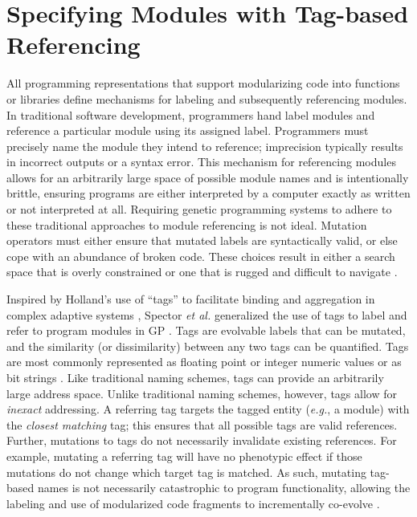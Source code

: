 
\section{Specifying Modules with Tag-based Referencing}
\label{chapter:tag-based-regulation:sec:tag-based-referencing}

All programming representations that support modularizing code into functions or libraries define mechanisms for labeling and subsequently referencing modules. 
In traditional software development, programmers hand label modules and reference a particular module using its assigned label.
Programmers must precisely name the module they intend to reference; imprecision typically results in incorrect outputs or a syntax error. 
This mechanism for referencing modules allows for an arbitrarily large space of possible module names and is intentionally brittle, ensuring programs are either interpreted by a computer exactly as written or not interpreted at all. 
Requiring genetic programming systems to adhere to these traditional approaches to module referencing is not ideal. 
Mutation operators must either ensure that mutated labels are syntactically valid, or else cope with an abundance of broken code.
These choices result in either a search space that is overly constrained or one that is rugged and difficult to navigate \citep{rasmussen_coreworld_1990}.

Inspired by Holland's use of ``tags'' to facilitate binding and aggregation in complex adaptive systems \citep{holland_concerning_1990,holland_effect_1993}, %
Spector \textit{et al.} generalized the use of tags to label and refer to program modules in GP \citep{spector_tag-based_2011,spector_whats_2011}.
Tags are evolvable labels that can be mutated, and the similarity (or dissimilarity) between any two tags can be quantified. 
Tags are most commonly represented as floating point or integer numeric values \citep{keijzer_run_2004,spector_tag-based_2011} or as bit strings \citep{lalejini_evolving_2018}.
Like traditional naming schemes, tags can provide an arbitrarily large address space.
Unlike traditional naming schemes, however, tags allow for \textit{inexact} addressing. 
A referring tag targets the tagged entity (\textit{e.g.}, a module) with the \textit{closest matching} tag; 
this ensures that all possible tags are valid references.
Further, mutations to tags do not necessarily invalidate existing references.
For example, mutating a referring tag will have no phenotypic effect if those mutations do not change which target tag is matched. 
As such, mutating tag-based names is not necessarily catastrophic to program functionality, allowing the labeling and use of modularized code fragments to incrementally co-evolve \citep{spector_tag-based_2011}.

